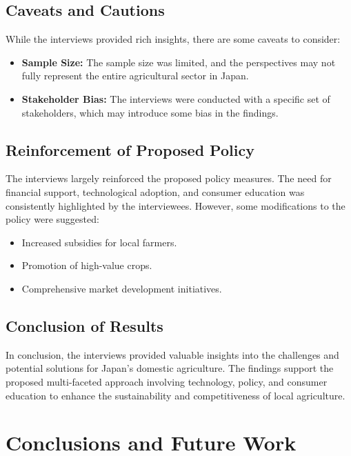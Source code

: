 \documentclass{article} %
\begin{document}
\subsection{Caveats and Cautions}

While the interviews provided rich insights, there are some caveats to consider:

\begin{itemize}
    \item \textbf{Sample Size:} The sample size was limited, and the perspectives may not fully represent the entire agricultural sector in Japan.
    \item \textbf{Stakeholder Bias:} The interviews were conducted with a specific set of stakeholders, which may introduce some bias in the findings.
\end{itemize}

\subsection{Reinforcement of Proposed Policy}

The interviews largely reinforced the proposed policy measures. The need for financial support, technological adoption, and consumer education was consistently highlighted by the interviewees. However, some modifications to the policy were suggested:

\begin{itemize}
    \item Increased subsidies for local farmers.
    \item Promotion of high-value crops.
    \item Comprehensive market development initiatives.
\end{itemize}

\subsection{Conclusion of Results}

In conclusion, the interviews provided valuable insights into the challenges and potential solutions for Japan's domestic agriculture. The findings support the proposed multi-faceted approach involving technology, policy, and consumer education to enhance the sustainability and competitiveness of local agriculture.

\section{Conclusions and Future Work}
\label{sec:conclusion}
\end{document}
